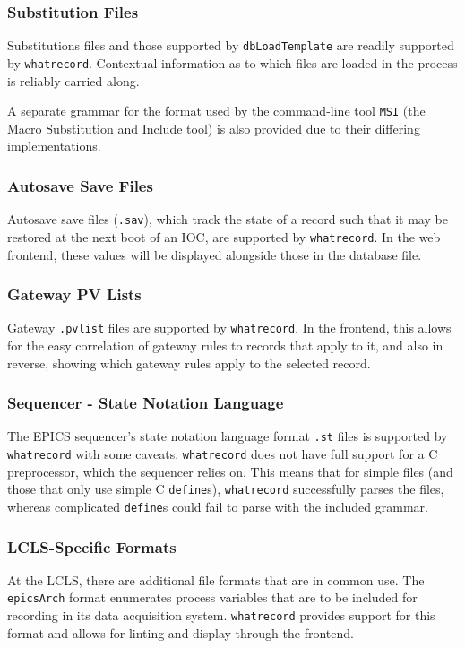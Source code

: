 \documentclass[letter,
               keeplastbox,   %
               ]{jacow}
\begin{document}
\subsubsection{Substitution Files} Substitutions files and those supported by
\verb_dbLoadTemplate_ are readily supported by \verb_whatrecord_.  Contextual
information as to which files are loaded in the process is reliably carried
along.

A separate grammar for the format used by the command-line tool \verb_MSI_ (the
Macro Substitution and Include tool) is also provided due to their differing
implementations.

\subsubsection{Autosave Save Files} Autosave save files (\verb_.sav_), which
track the state of a record such that it may be restored at the next boot of an
IOC, are supported by \verb_whatrecord_. In the web frontend, these values will
be displayed alongside those in the database file.

\subsubsection{Gateway PV Lists} Gateway \verb_.pvlist_ files are supported by
\verb_whatrecord_.  In the frontend, this allows for the easy correlation of
gateway rules to records that apply to it, and also in reverse, showing which
gateway rules apply to the selected record.

\subsubsection{Sequencer - State Notation Language} The EPICS sequencer's state
notation language format \verb_.st_ files is supported by \verb_whatrecord_
with some caveats. \verb_whatrecord_ does not have full support for a C
preprocessor, which the sequencer relies on.  This means that for simple files
(and those that only use simple C \verb_define_s), \verb_whatrecord_
successfully parses the files, whereas complicated \verb_define_s could fail to
parse with the included grammar.

\subsubsection{LCLS-Specific Formats} At the LCLS, there are additional file
formats that are in common use. The \verb_epicsArch_ format enumerates process
variables that are to be included for recording in its data acquisition system.
\verb_whatrecord_ provides support for this format and allows for linting and
display through the frontend.
\end{document}
